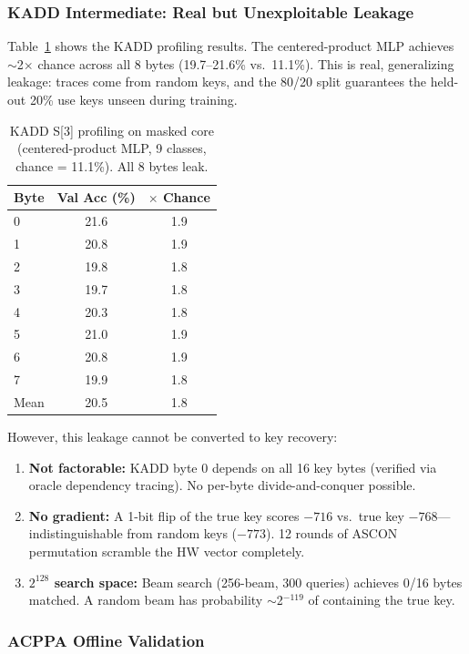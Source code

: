 \documentclass[a4paper,11pt,twocolumn]{article}
\begin{document}
\subsubsection{KADD Intermediate: Real but Unexploitable Leakage}

Table~\ref{tab:kadd_masked} shows the KADD profiling results. The centered-product MLP achieves $\sim$2$\times$ chance across all 8 bytes (19.7--21.6\% vs.\ 11.1\%). This is real, generalizing leakage: traces come from random keys, and the 80/20 split guarantees the held-out 20\% use keys unseen during training.

\begin{table}[t]
\centering
\caption{KADD S[3] profiling on masked core (centered-product MLP, 9 classes, chance = 11.1\%). All 8 bytes leak.}
\label{tab:kadd_masked}
\begin{tabular}{lcc}
\toprule
Byte & Val Acc (\%) & $\times$ Chance \\
\midrule
0 & 21.6 & 1.9 \\
1 & 20.8 & 1.9 \\
2 & 19.8 & 1.8 \\
3 & 19.7 & 1.8 \\
4 & 20.3 & 1.8 \\
5 & 21.0 & 1.9 \\
6 & 20.8 & 1.9 \\
7 & 19.9 & 1.8 \\
\midrule
Mean & 20.5 & 1.8 \\
\bottomrule
\end{tabular}
\end{table}

However, this leakage cannot be converted to key recovery:
\begin{enumerate}[leftmargin=*,nosep]
\item \textbf{Not factorable:} KADD byte 0 depends on all 16 key bytes (verified via oracle dependency tracing). No per-byte divide-and-conquer possible.
\item \textbf{No gradient:} A 1-bit flip of the true key scores $-716$ vs.\ true key $-768$---indistinguishable from random keys ($-773$). 12 rounds of ASCON permutation scramble the HW vector completely.
\item \textbf{$2^{128}$ search space:} Beam search (256-beam, 300 queries) achieves 0/16 bytes matched. A random beam has probability $\sim$2$^{-119}$ of containing the true key.
\end{enumerate}

\subsubsection{ACPPA Offline Validation}
\end{document}
